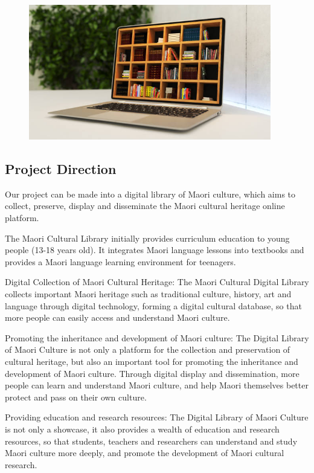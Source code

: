 \begin{figure}[htbp]
  \centerline{\includegraphics[width=300pt]{images/M1-2-1.png}}
\end{figure}

\subsection{Project Direction}
Our project can be made into a digital library of Maori culture, which aims to collect, preserve, display and disseminate the Maori cultural heritage online platform.

The Maori Cultural Library initially provides curriculum education to young people (13-18 years old). It integrates Maori language lessons into textbooks and provides a Maori language learning environment for teenagers.

Digital Collection of Maori Cultural Heritage: The Maori Cultural Digital Library collects important Maori heritage such as traditional culture, history, art and language through digital technology, forming a digital cultural database, so that more people can easily access and understand Maori culture.

Promoting the inheritance and development of Maori culture: The Digital Library of Maori Culture is not only a platform for the collection and preservation of cultural heritage, but also an important tool for promoting the inheritance and development of Maori culture. Through digital display and dissemination, more people can learn and understand Maori culture, and help Maori themselves better protect and pass on their own culture.

Providing education and research resources: The Digital Library of Maori Culture is not only a showcase, it also provides a wealth of education and research resources, so that students, teachers and researchers can understand and study Maori culture more deeply, and promote the development of Maori cultural research.

